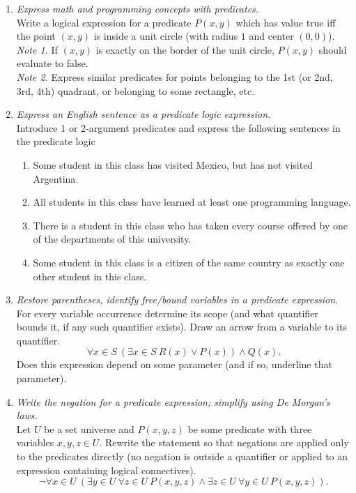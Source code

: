 \documentclass[a4paper,12pt]{article}
\begin{document}
\begin{enumerate}
\item {\small \em
Express math and programming concepts with predicates.}\\
Write a logical expression for a predicate $P(x,y)$ which has
value true iff the point $(x,y)$ is inside a unit circle (with radius $1$
and center $(0,0)$).\\
{\em Note 1.} If $(x,y)$ is exactly on the border of the unit circle,
$P(x,y)$ should evaluate to false.\\
{\em Note 2.} Express similar predicates for points belonging to
the 1st (or 2nd, 3rd, 4th) quadrant, or belonging to some rectangle, etc.

\item {\small \em
Express an English sentence as a predicate logic expression.}\\
Introduce 1 or 2-argument predicates and express the following sentences in the predicate logic
\begin{enumerate}
\item Some student in this class has visited Mexico, but has not visited Argentina.
\item All students in this class have learned at least one programming language.
\item There is a student in this class who has taken every course offered  by
one of the departments of this university.
\item Some student in this class is a citizen of the same country as exactly one other
student in this class.
\end{enumerate}

\item {\small \em
Restore parentheses, identify free/bound variables in a predicate expression.}\\
For every variable occurrence determine its scope (and what quantifier bounds it, if any
such quantifier exists). Draw an arrow from a variable to its quantifier.
\[ \forall x \in S\  \left( \exists x \in S\ R(x) \vee P(x) \right) \wedge Q(x). \]
Does this expression depend on some parameter (and if so, underline that parameter).

\item {\small \em
Write the negation for a predicate expression; simplify using De Morgan’s laws.}\\
Let $U$ be a set universe and $P(x,y,z)$ be some predicate with three variables $x,y,z \in U$.
Rewrite the statement so that negations are applied only to the predicates directly
(no negation is outside a quantifier or applied to an expression containing logical connectives).
\[ \neg \forall x \in U\
\left( \exists y \in U\ \forall z \in U\ P(x,y,z) \wedge \exists z \in U\ \forall y \in U\ P(x,y,z)  \right). \]


\end{enumerate}
\end{document}
